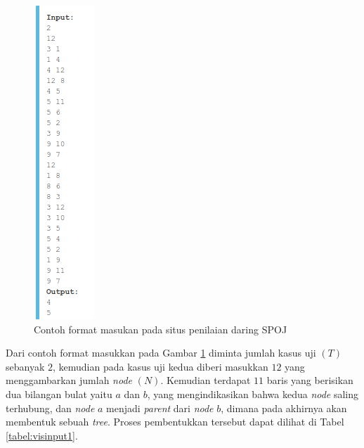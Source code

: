 \begin{figure}[H]
	\centerline{ \includegraphics[scale=0.43]{assets/images/input-output.png}}
	\caption{Contoh format masukan pada situs penilaian daring SPOJ}
	\label{figure:i/o}
\end{figure}
\quad Dari contoh format masukkan pada Gambar \ref{figure:i/o} diminta jumlah kasus uji $(T)$ sebanyak $2$, kemudian pada kasus uji kedua diberi masukkan $12$ yang menggambarkan jumlah \textit{node} $(N)$. Kemudian terdapat $11$ baris yang berisikan dua bilangan bulat yaitu $a$ dan $b$, yang mengindikasikan bahwa kedua \textit{node} saling terhubung, dan \textit{node} $a$ menjadi \textit{parent} dari \textit{node} $b$, dimana pada akhirnya akan membentuk sebuah \textit{tree}. Proses pembentukkan tersebut dapat dilihat di Tabel \ref{tabel:visinput1}.
